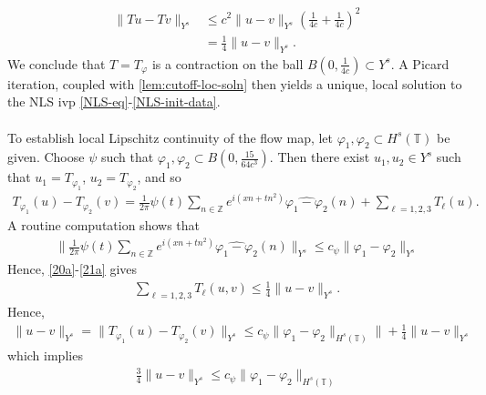 \documentclass[12pt,reqno]{amsart}
\numberwithin{equation}{section}  %
\numberwithin{figure}{section}
\newcommand{\zz}{\mathbb{Z}}
\newcommand{\ci}{\mathbb{T}}
\newcommand{\wh}{\widehat}
\newcommand{\vp}{\varphi}
\theoremstyle{plain}
\theoremstyle{definition}
\theoremstyle{remark}
\begin{document}
%
\begin{equation}
	\label{21a}
	\begin{split}
		\|Tu - Tv \|_{Y^s}
		& \le c^2 \|u -v \|_{Y^s} \left( \frac{1}{4c} + 
		\frac{1}{4c} \right)^2
		\\
		& = \frac{1}{4} \|u -v \|_{Y^s}. 
	\end{split}
\end{equation}
%
We conclude that $T = T_{\vp}$ is a contraction on the ball $B(0, 
\frac{1}{4c}) \subset Y^s$. A Picard iteration, coupled with
\autoref{lem:cutoff-loc-soln} then yields a unique, local
solution to the NLS ivp \eqref{NLS-eq}-\eqref{NLS-init-data}.
\\
\\
To establish local Lipschitz continuity of the flow map, let $\vp_1, \vp_2
\subset H^s(\ci)$ be given. Choose $\psi$ such that $\vp_1, \vp_2 \subset
B(0, \frac{15}{64c^{3}})$.  Then there exist $u_1, u_2 \in Y^s$ such that 
$u_1 = T_{\vp_1}$, $u_2 = T_{\vp_2}$, and so
%
%
\begin{equation*}
	\begin{split}
		T_{\vp_1}(u) - T_{\vp_2}(v) = \frac{1}{2\pi} \psi(t) \sum_{n \in
		\zz}e^{i\left( xn + tn^2 \right)} \wh{\vp_1 - \vp_2}(n) + \sum_{\ell
		= 1,2,3} T_{\ell}(u).
	\end{split}
\end{equation*}
%
%
A routine computation shows that
%
%
\begin{equation*}
	\begin{split}
		\| \frac{1}{2\pi} \psi(t) \sum_{n \in
		\zz}e^{i\left( xn + tn^2 \right)} \wh{\vp_1 - \vp_2}(n)\|_{Y^s}
		\le c_\psi \|\vp_{1} - \vp_{2}\|_{Y^s} 
	\end{split}
\end{equation*}
%
%
Hence, \eqref{20a}-\eqref{21a} gives
%
%
\begin{equation*}
	\begin{split}
		\sum_{\ell=1,2,3} T_{\ell}(u,v) \le \frac{1}{4}\|u-v\|_{Y^s}.
	\end{split}
\end{equation*}
%
%
Hence,
%
%
\begin{equation*}
	\begin{split}
		\|u -v \|_{Y^s} = \|T_{\vp_1}(u) - T_{\vp_2}(v) \|_{Y^s} \le c_\psi
		\|\vp_{1} - \vp_{2} \|_{H^{s}\left( \ci \right)}\| +
		\frac{1}{4} \|u -v \|_{Y^s}
	\end{split}
\end{equation*}
%
%
which implies
%
%
\begin{equation*}
	\begin{split}
		\frac{3}{4} \|u-v\|_{Y^s} \le c_\psi \|\vp_1 - \vp_2 \|_{H^s(\ci)}
	\end{split}
\end{equation*}
\end{document}
